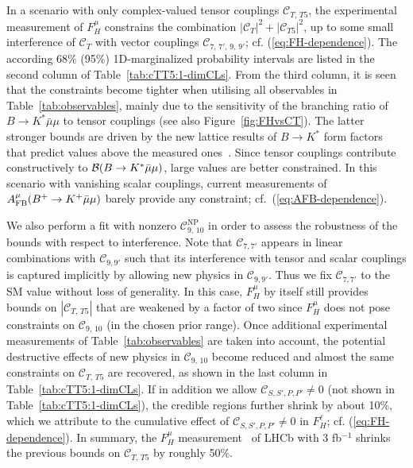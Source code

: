 \documentclass[twocolumn,epjc3]{svjour3}
\numberwithin{equation}{section}
\def \refeq#1{(\ref{#1})}
\def \reffig#1{Figure~\ref{#1}}
\def \reftab#1{Table~\ref{#1}}
\newcommand{\wilson}[2][{}]{\mathcal{C}_{#2}^{\mathrm{#1}}}
\renewcommand{\[}{\big[}
\renewcommand{\]}{\big]}
\renewcommand{\(}{\big(}
\renewcommand{\)}{\big)}
\begin{document}
In a scenario with only {complex-valued tensor couplings} $\wilson{T,\, T5}$, the
experimental measurement of $F_H^\mu$ constrains the combination $|\wilson{T}|^2
+ |\wilson{T5}|^2$, up to some small interference of $\wilson{T}$ with vector
couplings $\wilson{7,\,7',\,9,\,9'}$; cf. \refeq{eq:FH-dependence}.  The
according 68\% (95\%) 1D-marginalized probability intervals are listed in the
second column of \reftab{tab:cTT5:1-dimCLs}. From the third column, it is seen
that the constraints become tighter when utilising all observables in
\reftab{tab:observables}, mainly due to the sensitivity of the branching ratio
of $B\to K^{*} \bar\mu\mu$ to tensor couplings (see also
\reffig{fig:FHvsCT}). The latter stronger bounds are driven by the new lattice
results of $B\to K^*$ form factors that predict values above the measured
{ones}~\cite{Horgan:2013pva}. Since tensor couplings contribute constructively
to ${\cal B}(B\to K^{*}\bar\mu\mu)$, large values are better constrained. In
this scenario with vanishing scalar couplings, current measurements of $A_{\rm
  FB}^\mu(B^+\to K^+\bar\mu\mu)$ barely provide any constraint;
cf.~\refeq{eq:AFB-dependence}.

We also perform a fit with nonzero $\wilson[NP]{9,\,10}$ in order to assess the
robustness of the bounds with respect to interference. Note that $\wilson{7,7'}$
appears in linear combinations with $\wilson{9,9'}$ such that its interference
with tensor and scalar couplings is captured implicitly by allowing new physics
in $\wilson{9,9'}$. Thus we fix $\wilson{7,7'}$ to the SM value without loss of
generality. In this case, $F_H^\mu$ by itself still provides bounds on
$|\wilson{T,\,T5}|$ that are weakened by a factor of two since $F_H^\mu$ does
not pose constraints on $\wilson{9,\,10}$ (in the chosen prior range). Once
additional experimental measurements of \reftab{tab:observables} are taken into
account, the potential destructive effects of new physics in $\wilson{9,\,10}$
become reduced and almost the same constraints on $\wilson{T,\,T5}$ are
recovered, as shown in the last column in \reftab{tab:cTT5:1-dimCLs}. If in
addition we allow $\wilson{S,S',P,P'} \ne 0$ (not shown in
\reftab{tab:cTT5:1-dimCLs}), the credible regions further shrink by about 10\%,
which we attribute to {the} cumulative effect of $\wilson{S,S',P,P'} \ne 0$ in
$F_H^\ell$; cf. \refeq{eq:FH-dependence}. In summary, the $F_H^\mu$
measurement~\cite{Aaij:2014tfa} of LHCb with 3 fb$^{-1}$ shrinks the previous
bounds \cite{Bobeth:2012vn} on $\wilson{T,\,T5}$ by roughly 50\%.
\end{document}
